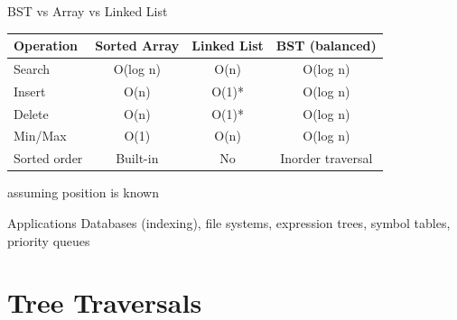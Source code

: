 \documentclass[aspectratio=169,xcolor=dvipsnames]{beamer}
\begin{document}
\begin{frame}{BST vs Array vs Linked List}
  \begin{table}
    \centering
    \begin{tabular}{l|c|c|c}
      \toprule
      \textbf{Operation} & \textbf{Sorted Array} & \textbf{Linked List} & \textbf{BST (balanced)} \\
      \midrule
      Search & O(log n) & O(n) & O(log n) \\
      Insert & O(n) & O(1)* & O(log n) \\
      Delete & O(n) & O(1)* & O(log n) \\
      Min/Max & O(1) & O(n) & O(log n) \\
      Sorted order & Built-in & No & Inorder traversal \\
      \bottomrule
    \end{tabular}
  \end{table}

  \vspace{0.2cm}
  {\small *assuming position is known}

  \vspace{0.3cm}

  \begin{exampleblock}{Applications}
    Databases (indexing), file systems, expression trees, symbol tables, priority queues
  \end{exampleblock}
\end{frame}

\section{Tree Traversals}
\end{document}
